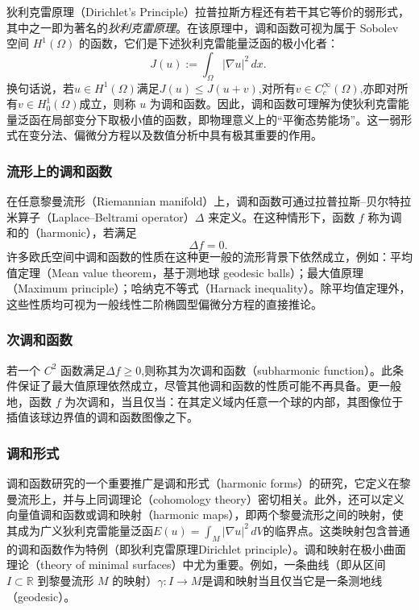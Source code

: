 狄利克雷原理（Dirichlet’s Principle）拉普拉斯方程还有若干其它等价的弱形式，其中之一即为著名的\emph{狄利克雷原理}。在该原理中，调和函数可视为属于 Sobolev 空间 \(H^1(\Omega)\) 的函数，它们是下述狄利克雷能量泛函的极小化者：
\[
J(u) := \int_{\Omega} |\nabla u|^2 \, dx.~
\]
换句话说，若\(u \in H^1(\Omega)\)满足\(J(u) \le J(u + v)\),对所有\(v \in C_c^\infty(\Omega)\),亦即对所有\(v \in H_0^1(\Omega)\)成立，则称 \(u\) 为调和函数。因此，调和函数可理解为使狄利克雷能量泛函在局部变分下取极小值的函数，即物理意义上的“平衡态势能场”。这一弱形式在变分法、偏微分方程以及数值分析中具有极其重要的作用。
\subsubsection{流形上的调和函数}
在任意黎曼流形（Riemannian manifold）上，调和函数可通过拉普拉斯–贝尔特拉米算子（Laplace–Beltrami operator）\(\Delta\) 来定义。在这种情形下，函数 \(f\) 称为调和的（harmonic），若满足
\[
\Delta f = 0.~
\]
许多欧氏空间中调和函数的性质在这种更一般的流形背景下依然成立，例如：平均值定理（Mean value theorem，基于测地球 geodesic balls）；最大值原理（Maximum principle）；哈纳克不等式（Harnack inequality）。除平均值定理外，这些性质均可视为一般线性二阶椭圆型偏微分方程的直接推论。
\subsubsection{次调和函数}
若一个 \(C^2\) 函数满足\(\Delta f \ge 0\),则称其为次调和函数（subharmonic function）。此条件保证了最大值原理依然成立，尽管其他调和函数的性质可能不再具备。更一般地，函数 \(f\) 为次调和，当且仅当：在其定义域内任意一个球的内部，其图像位于插值该球边界值的调和函数图像之下。
\subsubsection{调和形式}
调和函数研究的一个重要推广是调和形式（harmonic forms）的研究，它定义在黎曼流形上，并与上同调理论（cohomology theory）密切相关。此外，还可以定义向量值调和函数或调和映射（harmonic maps），即两个黎曼流形之间的映射，使其成为广义狄利克雷能量泛函\(E(u) = \int_M |\nabla u|^2 \, dV\)的临界点。这类映射包含普通的调和函数作为特例（即狄利克雷原理Dirichlet principle）。调和映射在极小曲面理论（theory of minimal surfaces）中尤为重要。例如，一条曲线（即从区间 \(I \subset \mathbb{R}\) 到黎曼流形 \(M\) 的映射）\(\gamma: I \to M\)是调和映射当且仅当它是一条测地线（geodesic）。








